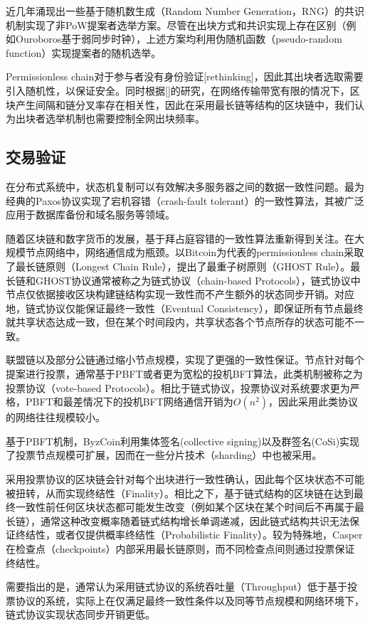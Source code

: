 近几年涌现出一些基于随机数生成（Random Number Generation，RNG）的共识机制实现了非PoW提案者选举方案\cite{gilad2017algorand,david2018ouroboros,hanke2018difinity}。尽管在出块方式和共识实现上存在区别（例如Ouroboros基于弱同步时钟），上述方案均利用伪随机函数（pseudo-random function）实现提案者的随机选举。

Permissionless chain对于参与者没有身份验证[rethinking]，因此其出块者选取需要引入随机性，以保证安全。同时根据[]的研究，在网络传输带宽有限的情况下，区块产生间隔和链分叉率存在相关性，因此在采用最长链等结构的区块链中，我们认为出块者选举机制也需要控制全网出块频率。

\subsection{交易验证}
\label{subsec:intro_tx_verification}
在分布式系统中，状态机复制可以有效解决多服务器之间的数据一致性问题\cite{schneider1990implementing}。最为经典的Paxos协议实现了宕机容错（crash-fault tolerant）的一致性算法\cite{lamport2001paxos}，其被广泛应用于数据库备份和域名服务等领域\cite{burrows2006chubby,chang2008bigtable}。

随着区块链和数字货币的发展，基于拜占庭容错的一致性算法重新得到关注。在大规模节点网络中，网络通信成为瓶颈。以Bitcoin为代表的permissionless chain采取了最长链原则（Longest Chain Rule）\cite{nakamoto2008bitcoin}，\cite{sompolinsky2015secure}提出了最重子树原则（GHOST Rule）。最长链和GHOST协议通常被称之为链式协议（chain-based Protocols），链式协议中节点仅依据接收区块构建链结构实现一致性而不产生额外的状态同步开销。对应地，链式协议仅能保证最终一致性（Eventual Consistency），即保证所有节点最终就共享状态达成一致，但在某个时间段内，共享状态各个节点所存的状态可能不一致。

联盟链以及部分公链通过缩小节点规模，实现了更强的一致性保证。节点针对每个提案进行投票，通常基于PBFT\cite{castro1999practical}或者更为宽松的投机BFT算法\cite{kotla2007zyzzyva}，此类机制被称之为投票协议（vote-based Protocols）。相比于链式协议，投票协议对系统要求更为严格，PBFT和最差情况下的投机BFT网络通信开销为$O(n^2)$，因此采用此类协议的网络往往规模较小。

基于PBFT机制，ByzCoin\cite{kogias2016enhancing}利用集体签名(collective signing)以及群签名(CoSi)实现了投票节点规模可扩展，因而在一些分片技术（sharding）中也被采用\cite{kokoris2018omniledger}。

采用投票协议的区块链会针对每个出块进行一致性确认，因此每个区块状态不可能被扭转，从而实现终结性（Finality）。相比之下，基于链式结构的区块链在达到最终一致性前任何区块状态都可能发生改变（例如某个区块在某个时间后不再属于最长链），通常这种改变概率随着链式结构增长单调递减\cite{nakamoto2008bitcoin}，因此链式结构共识无法保证终结性，或者仅提供概率终结性（Probabilistic Finality）。较为特殊地，Casper\cite{buterin2017casper}在检查点（checkpoints）内部采用最长链原则，而不同检查点间则通过投票保证终结性。

需要指出的是，通常认为采用链式协议的系统吞吐量（Throughput）低于基于投票协议的系统，实际上在仅满足最终一致性条件以及同等节点规模和网络环境下，链式协议实现状态同步开销更低。








